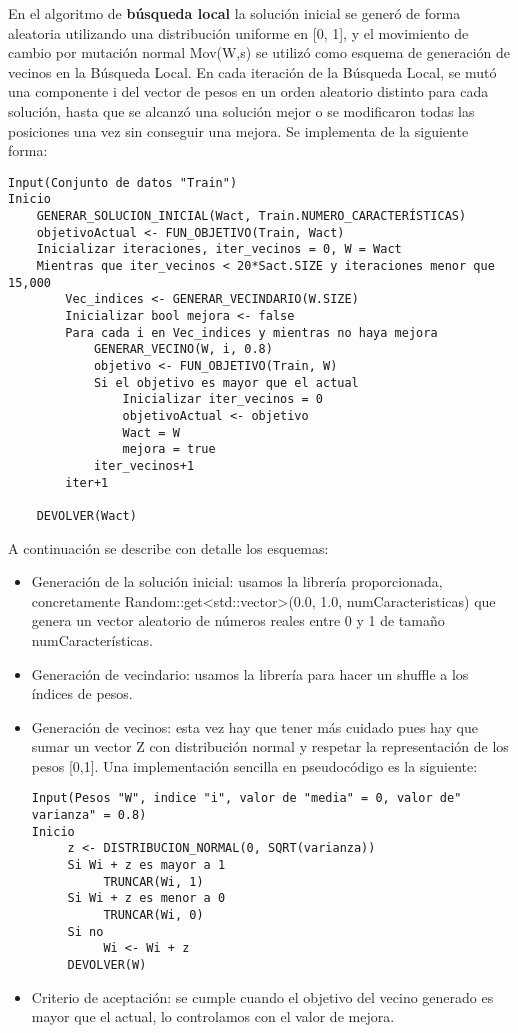 En el algoritmo de \textbf{búsqueda local} la solución inicial se generó de forma aleatoria utilizando una distribución uniforme en [0, 1], y el movimiento de cambio por mutación normal Mov(W,s) se utilizó como esquema de generación de vecinos en la Búsqueda Local. En cada iteración de la Búsqueda Local, se mutó una componente i del vector de pesos en un orden aleatorio distinto para cada solución, hasta que se alcanzó una solución mejor o se modificaron todas las posiciones una vez sin conseguir una mejora. Se implementa de la siguiente forma:
\begin{verbatim}
Input(Conjunto de datos "Train")
Inicio
    GENERAR_SOLUCION_INICIAL(Wact, Train.NUMERO_CARACTERÍSTICAS)
    objetivoActual <- FUN_OBJETIVO(Train, Wact)
    Inicializar iteraciones, iter_vecinos = 0, W = Wact
    Mientras que iter_vecinos < 20*Sact.SIZE y iteraciones menor que 15,000
        Vec_indices <- GENERAR_VECINDARIO(W.SIZE)
        Inicializar bool mejora <- false
        Para cada i en Vec_indices y mientras no haya mejora
            GENERAR_VECINO(W, i, 0.8)
            objetivo <- FUN_OBJETIVO(Train, W)
            Si el objetivo es mayor que el actual
                Inicializar iter_vecinos = 0
                objetivoActual <- objetivo
                Wact = W
                mejora = true
            iter_vecinos+1
        iter+1
    	
    DEVOLVER(Wact)
\end{verbatim}
A continuación se describe con detalle los esquemas:
\begin{itemize}
	\item Generación de la solución inicial: usamos la librería  proporcionada, concretamente Random::get<std::vector>(0.0, 1.0, numCaracteristicas) que genera un vector aleatorio de números reales entre 0 y 1 de tamaño numCaracterísticas.
	\item Generación de vecindario: usamos la librería  para hacer un shuffle a los índices de pesos.
	\item Generación de vecinos: esta vez hay que tener más cuidado pues hay que sumar un vector Z con distribución normal y respetar la representación de los pesos [0,1]. Una implementación sencilla en pseudocódigo es la siguiente:
	\begin{verbatim}
Input(Pesos "W", indice "i", valor de "media" = 0, valor de" varianza" = 0.8)
Inicio
     z <- DISTRIBUCION_NORMAL(0, SQRT(varianza))
     Si Wi + z es mayor a 1
          TRUNCAR(Wi, 1)
     Si Wi + z es menor a 0
          TRUNCAR(Wi, 0)
     Si no
          Wi <- Wi + z
     DEVOLVER(W)
	\end{verbatim}

\item Criterio de aceptación: se cumple cuando el objetivo del vecino generado es mayor que el actual, lo controlamos con el valor de mejora.
\end{itemize}

